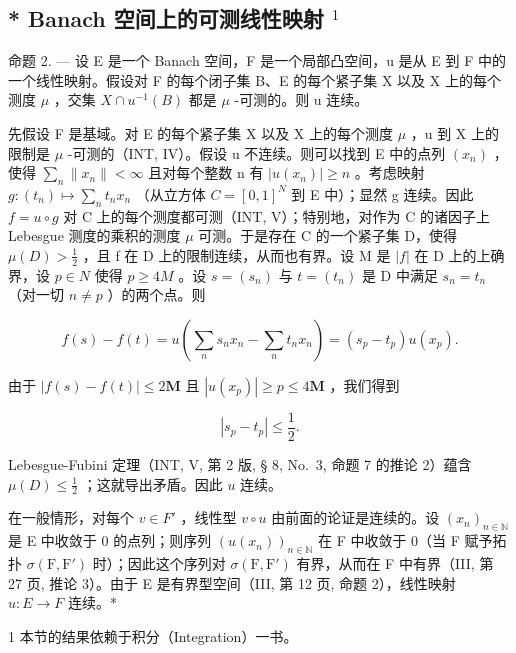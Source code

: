 \subsection{\texorpdfstring{* Banach 空间上的可测线性映射 \(^{1}\)}{Banach 空间上的可测线性映射 \^{}\{1\}}}

命题 2. --- 设 E 是一个 Banach 空间，F 是一个局部凸空间，u 是从 E 到 F 中的一个线性映射。假设对 F 的每个闭子集 B、E 的每个紧子集 X 以及 X 上的每个测度 \(\mu\) ，交集 \(X \cap u^{-1}(B)\) 都是 \(\mu\) -可测的。则 u 连续。

先假设 F 是基域。对 E 的每个紧子集 X 以及 X 上的每个测度 \(\mu\) ，u 到 X 上的限制是 \(\mu\) -可测的（INT, IV）。假设 u 不连续。则可以找到 E 中的点列 \((x_{n})\) ，使得 \(\sum_{n} \|x_{n}\| < \infty\) 且对每个整数 n 有 \(|u(x_{n})| \geqslant n\) 。考虑映射 \(g:(t_{n}) \mapsto \sum_{n} t_{n} x_{n}\) （从立方体 \(C = [0, 1]^{N}\) 到 E 中）；显然 g 连续。因此 \(f = u \circ g\) 对 C 上的每个测度都可测（INT, V）；特别地，对作为 C 的诸因子上 Lebesgue 测度的乘积的测度 \(\mu\) 可测。于是存在 C 的一个紧子集 D，使得 \(\mu(D) > \frac{1}{2}\) ，且 f 在 D 上的限制连续，从而也有界。设 M 是 \(|f|\) 在 D 上的上确界，设 \(p \in N\) 使得 \(p \geqslant 4M\) 。设 \(s = (s_{n})\) 与 \(t = (t_{n})\) 是 D 中满足 \(s_{n} = t_{n}\) （对一切 \(n \neq p\) ）的两个点。则

\[
f (s) - f (t) = u (\sum_ {n} s _ {n} x _ {n} - \sum_ {n} t _ {n} x _ {n}) = (s _ {p} - t _ {p}) u (x _ {p}).
\]

由于 \(|f(s) - f(t)| \leqslant 2\mathbf{M}\) 且 \(|u(x_p)| \geqslant p \leqslant 4\mathbf{M}\) ，我们得到

\[
\left| s _ {p} - t _ {p} \right| \leqslant \frac {1}{2}.
\]

Lebesgue-Fubini 定理（INT, V, 第 2 版, § 8, No.~3, 命题 7 的推论 2）蕴含 \(\mu(D) \leqslant \frac{1}{2}\) ；这就导出矛盾。因此 \(u\) 连续。

在一般情形，对每个 \(v \in F'\) ，线性型 \(v \circ u\) 由前面的论证是连续的。设 \((x_{n})_{n \in \mathbb{N}}\) 是 E 中收敛于 0 的点列；则序列 \((u(x_{n}))_{n \in \mathbb{N}}\) 在 F 中收敛于 0（当 F 赋予拓扑 \(\sigma(\mathrm{F}, \mathrm{F}')\) 时）；因此这个序列对 \(\sigma(\mathrm{F}, \mathrm{F}')\) 有界，从而在 F 中有界（III, 第 27 页, 推论 3）。由于 E 是有界型空间（III, 第 12 页, 命题 2），线性映射 \(u: E \to F\) 连续。*

1 本节的结果依赖于积分（Integration）一书。


